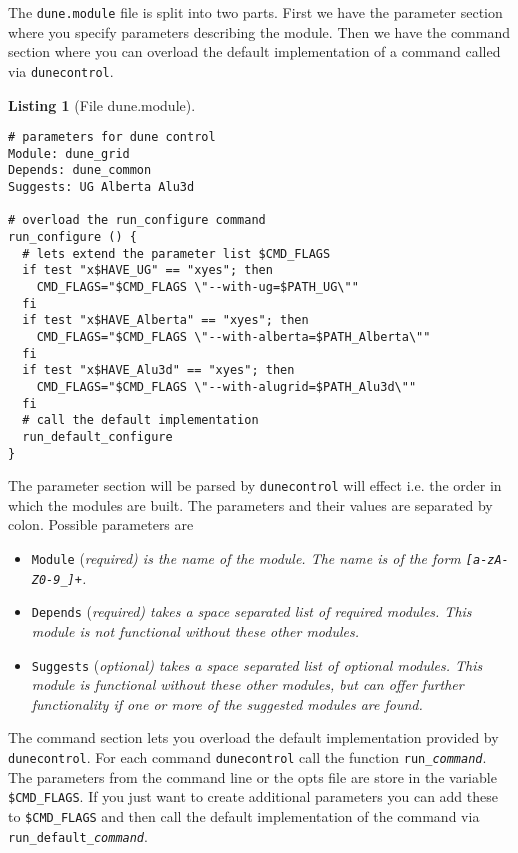 \documentclass[11pt,a4paper,headinclude,footinclude,DIV16,normalheadings]{scrartcl}
\newtheorem{lst}{Listing}
\newcommand{\dunecontrol}{\texttt{dunecontrol}\xspace}
\newcommand{\dunemodule}{\texttt{dune.module}\xspace}
\begin{document}

The \dunemodule file is split into two parts. First we have the
parameter section where you specify parameters describing the module.
Then we have the command section where you can overload the default
implementation of a command called via \dunecontrol.

\begin{lst}[File dune.module] \mbox{}
\begin{lstlisting}
# parameters for dune control
Module: dune_grid
Depends: dune_common
Suggests: UG Alberta Alu3d

# overload the run_configure command
run_configure () {
  # lets extend the parameter list $CMD_FLAGS
  if test "x$HAVE_UG" == "xyes"; then
    CMD_FLAGS="$CMD_FLAGS \"--with-ug=$PATH_UG\""
  fi
  if test "x$HAVE_Alberta" == "xyes"; then
    CMD_FLAGS="$CMD_FLAGS \"--with-alberta=$PATH_Alberta\""
  fi  
  if test "x$HAVE_Alu3d" == "xyes"; then
    CMD_FLAGS="$CMD_FLAGS \"--with-alugrid=$PATH_Alu3d\""
  fi
  # call the default implementation
  run_default_configure
}
\end{lstlisting}
\end{lst}

The parameter section will be parsed by \dunecontrol will effect
i.e. the order in which the modules are built. The parameters and
their values are separated by colon. Possible parameters are
\begin{itemize}
\item \texttt{Module} (\em required\em) is the name of the module. The
  name is of the form \texttt{[a-zA-Z0-9\_]+}.
\item \texttt{Depends} (\em required\em) takes a space separated list
  of required modules. This module is not functional without these
  other modules.
\item \texttt{Suggests} (\em optional\em) takes a space separated list
  of optional modules. This module is functional without these
  other modules, but can offer further functionality if one or more of
  the suggested modules are found.
\end{itemize}

The command section lets you overload the default implementation
provided by \dunecontrol. For each command \dunecontrol call the
function \texttt{run\_\textit{command}}. The parameters from the
command line or the opts file are store in the variable
\texttt{\$CMD\_FLAGS}. If you just want to create additional parameters
you can add these to \texttt{\$CMD\_FLAGS} and then call the default
implementation of the command via
\texttt{run\_default\_\textit{command}}.
\end{document}
